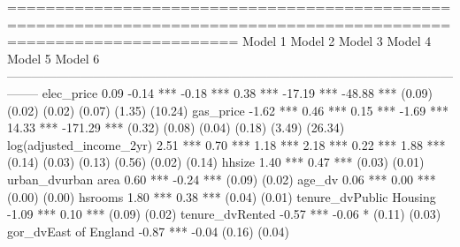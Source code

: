 
====================================================================================================================
                                Model 1       Model 2       Model 3       Model 4       Model 5        Model 6      
--------------------------------------------------------------------------------------------------------------------
elec_price                          0.09         -0.14 ***     -0.18 ***      0.38 ***     -17.19 ***     -48.88 ***
                                   (0.09)        (0.02)        (0.02)        (0.07)         (1.35)        (10.24)   
gas_price                          -1.62 ***      0.46 ***      0.15 ***     -1.69 ***      14.33 ***    -171.29 ***
                                   (0.32)        (0.08)        (0.04)        (0.18)         (3.49)        (26.34)   
log(adjusted_income_2yr)            2.51 ***      0.70 ***      1.18 ***      2.18 ***       0.22 ***       1.88 ***
                                   (0.14)        (0.03)        (0.13)        (0.56)         (0.02)         (0.14)   
hhsize                              1.40 ***      0.47 ***                                                          
                                   (0.03)        (0.01)                                                             
urban_dvurban area                  0.60 ***     -0.24 ***                                                          
                                   (0.09)        (0.02)                                                             
age_dv                              0.06 ***      0.00 ***                                                          
                                   (0.00)        (0.00)                                                             
hsrooms                             1.80 ***      0.38 ***                                                          
                                   (0.04)        (0.01)                                                             
tenure_dvPublic Housing            -1.09 ***      0.10 ***                                                          
                                   (0.09)        (0.02)                                                             
tenure_dvRented                    -0.57 ***     -0.06 *                                                            
                                   (0.11)        (0.03)                                                             
gor_dvEast of England              -0.87 ***     -0.04                                                              
                                   (0.16)        (0.04)                                                             
